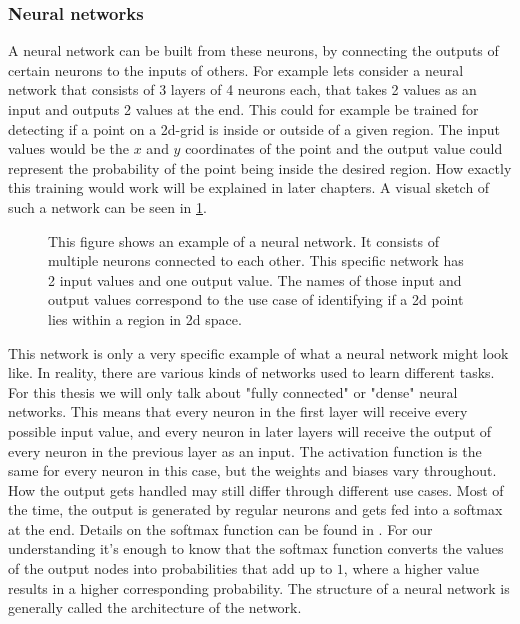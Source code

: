 \subsubsection{Neural networks}\label{sec:NeuralNetworks}
A neural network can be built from these neurons, by connecting the outputs of certain neurons to the inputs of others. For example lets consider a neural network that consists of 3 layers of 4 neurons each, that takes 2 values as an input and outputs 2 values at the end. This could for example be trained for detecting if a point on a 2d-grid is inside or outside of a given region. The input values would be the $x$ and $y$ coordinates of the point and the output value could represent the probability of the point being inside the desired region. How exactly this training would work will be explained in later chapters. A visual sketch of such a network can be seen in \cref{fig:Neural_network_example}. \\
\begin{figure}
	\centering
	
	\caption{This figure shows an example of a neural network. It consists of multiple neurons connected to each other. This specific network has 2 input values and one output value. The names of those input and output values correspond to the use case of identifying if a 2d point lies within a region in 2d space.}
	\label{fig:Neural_network_example}
\end{figure}
This network is only a very specific example of what a neural network might look like. In reality, there are various kinds of networks used to learn different tasks. For this thesis we will only talk about "fully connected" or "dense" neural networks. This means that every neuron in the first layer will receive every possible input value, and every neuron in later layers will receive the output of every neuron in the previous layer as an input. The activation function is the same for every neuron in this case, but the weights and biases vary throughout. How the output gets handled may still differ through different use cases. Most of the time, the output is generated by regular neurons and gets fed into a softmax at the end. Details on the softmax function can be found in \cite{gao2018properties}. For our understanding it's enough to know that the softmax function converts the values of the output nodes into probabilities that add up to $1$, where a higher value results in a higher corresponding probability. The structure of a neural network is generally called the architecture of the network. 
